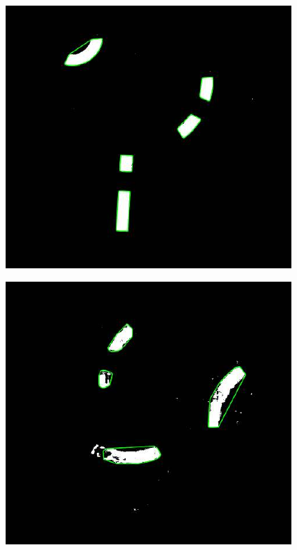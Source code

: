\documentclass[10pt]{article}
\begin{document}
\begin{figure}[h]
\begin{minipage}[h]{0.19\linewidth}
\begin{center}
			\end{center}
		\end{minipage}
		\hfill
		\begin{minipage}[h]{0.19\linewidth}
			\begin{center}
				{\includegraphics[width=1.0\linewidth]{data/yellow_example.pdf}}
			\end{center}
		\end{minipage}
	    \hfill
	    \begin{minipage}[h]{0.19\linewidth}
	    	\begin{center}
	    		{\includegraphics[width=1.0\linewidth]{data/blue_example.pdf}}

\end{center}
\end{minipage}
\end{figure}
\end{document}

